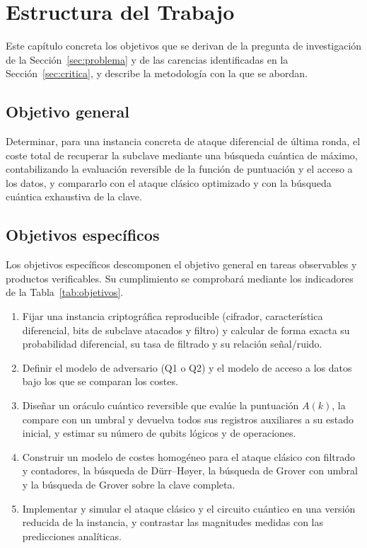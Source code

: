 \chapter{Estructura del Trabajo}
\label{chap:objetivos}

Este capítulo concreta los objetivos que se derivan de la pregunta de investigación de la Sección~\ref{sec:problema} y de las carencias identificadas en la Sección~\ref{sec:critica}, y describe la metodología con la que se abordan.

\section{Objetivo general}

Determinar, para una instancia concreta de ataque diferencial de última ronda, el coste total de recuperar la subclave mediante una búsqueda cuántica de máximo, contabilizando la evaluación reversible de la función de puntuación y el acceso a los datos, y compararlo con el ataque clásico optimizado y con la búsqueda cuántica exhaustiva de la clave.

\section{Objetivos específicos}

Los objetivos específicos descomponen el objetivo general en tareas observables y productos verificables. Su cumplimiento se comprobará mediante los indicadores de la Tabla~\ref{tab:objetivos}.

\begin{enumerate}
 \item[OE1.] Fijar una instancia criptográfica reproducible (cifrador, característica diferencial, bits de subclave atacados y filtro) y calcular de forma exacta su probabilidad diferencial, su tasa de filtrado y su relación señal/ruido.
 \item[OE2.] Definir el modelo de adversario (Q1 o Q2) y el modelo de acceso a los datos bajo los que se comparan los costes.
 \item[OE3.] Diseñar un oráculo cuántico reversible que evalúe la puntuación \(A(k)\), la compare con un umbral y devuelva todos sus registros auxiliares a su estado inicial, y estimar su número de qubits lógicos y de operaciones.
 \item[OE4.] Construir un modelo de costes homogéneo para el ataque clásico con filtrado y contadores, la búsqueda de Dürr--Høyer, la búsqueda de Grover con umbral y la búsqueda de Grover sobre la clave completa.
 \item[OE5.] Implementar y simular el ataque clásico y el circuito cuántico en una versión reducida de la instancia, y contrastar las magnitudes medidas con las predicciones analíticas.
\end{enumerate}

